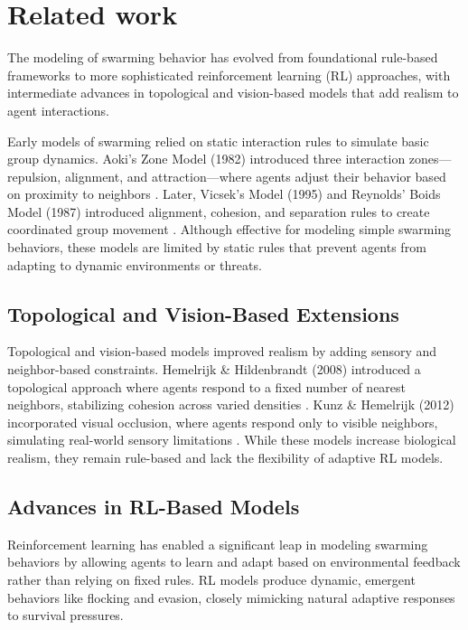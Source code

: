 \documentclass[9pt]{pnas-new}
\begin{document}
\section*{Related work}
The modeling of swarming behavior has evolved from foundational rule-based 
frameworks to more sophisticated reinforcement learning (RL) approaches, 
with intermediate advances in topological and vision-based models that 
add realism to agent interactions.

Early models of swarming relied on static interaction rules to 
simulate basic group dynamics. Aoki's Zone Model (1982) introduced 
three interaction zones—repulsion, alignment, and attraction—where agents 
adjust their behavior based on proximity to neighbors \cite{}. Later, Vicsek's Model (1995) and Reynolds’ Boids Model (1987) introduced alignment, cohesion, and separation rules to create coordinated group movement \cite{}. Although effective for modeling simple swarming behaviors, these models are limited by static rules that prevent agents from adapting to dynamic environments or threats.

\subsection{Topological and Vision-Based Extensions}

Topological and vision-based models improved realism by adding sensory and neighbor-based constraints. Hemelrijk \& Hildenbrandt (2008) introduced a topological approach where agents respond to a fixed number of nearest neighbors, stabilizing cohesion across varied densities \cite{}. Kunz \& Hemelrijk (2012) incorporated visual occlusion, where agents respond only to visible neighbors, simulating real-world sensory limitations \cite{}. While these models increase biological realism, they remain rule-based and lack the flexibility of adaptive RL models.

\subsection{Advances in RL-Based Models}

Reinforcement learning has enabled a significant leap in modeling swarming behaviors by allowing agents to learn and adapt based on environmental feedback rather than relying on fixed rules. RL models produce dynamic, emergent behaviors like flocking and evasion, closely mimicking natural adaptive responses to survival pressures.
\end{document}
